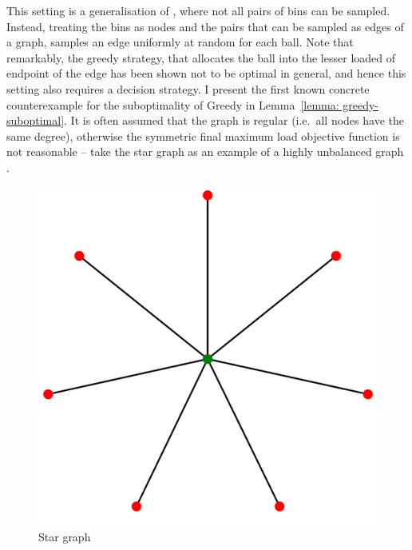 This setting is a generalisation of \TwoChoice, where not all pairs of bins can be sampled. Instead, treating the bins as nodes and the pairs that can be sampled as edges of a graph, \GraphicalTwoChoice samples an edge uniformly at random for each ball. Note that remarkably, the greedy strategy, that allocates the ball into the lesser loaded of endpoint of the edge has been shown not to be optimal in general, and hence this setting also requires a decision strategy. I present the first known concrete counterexample for the suboptimality of Greedy in Lemma~\ref{lemma: greedy-suboptimal}. It is often assumed that the graph is regular (i.e.\ all nodes have the same degree), otherwise the symmetric final maximum load objective function is not reasonable -- take the star graph as an example of a highly unbalanced graph .

\begin{figure}[hbt!] \label{star-graph}
    \centering
    \includegraphics[scale=0.1]{Chapter2/Figs/star_graph.png}
    \caption{Star graph~\cite{stargraph}}
\end{figure}

